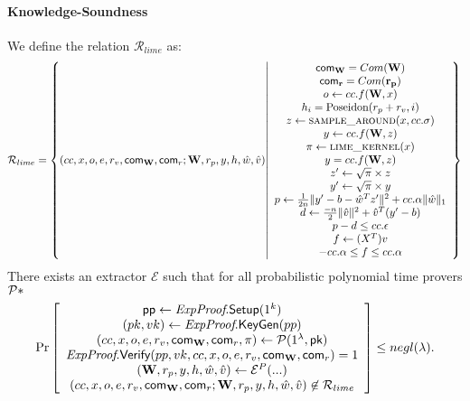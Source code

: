 \paragraph{Knowledge-Soundness}
We define the relation $\mathcal{R}_{lime}$ as:
\[
    \mathcal{R}_{lime} = \left \{ 
            (cc, x, o, e, r_v, \textsf{com}_{\mathbf{W}}, \textsf{com}_r; \mathbf{W}, r_p, y, h, \hat{w}, \hat{v}) \middle \vert 
        \begin{array}{c}
            \textsf{com}_{\mathbf{W}} = Com(\mathbf{W})\\
            \textsf{com}_{\mathbf{r}} = Com(\mathbf{r_p})\\
            o \gets cc.f(\mathbf{W}, x)\\
            h_i = \text{Poseidon}(r_p + r_v, i)\\
            z \gets \textsc{sample\_around}(x, cc.\sigma)\\
            y \gets cc.f(\mathbf{W}, z)\\
            \pi \gets \textsc{lime\_kernel}(x)\\
            y = cc.f(\mathbf{W}, z)\\
            z' \gets \sqrt{\pi} \times z\\
            y' \gets \sqrt{\pi} \times y\\
            p \gets \frac{1}{2n}\lVert y' - b - \hat{w}^Tz' \rVert ^2 + cc.\alpha \lVert \hat{w}\rVert_1\\
            d \gets \frac{-n}{2} \lVert \hat{v} \rVert^2 + \hat{v}^T(y' - b)\\
            p - d \leq cc.\epsilon\\
            f \gets (X^T)v\\
            -cc.\alpha \leq f \leq cc.\alpha
        \end{array}
        \right \}
\]
There exists an extractor $\mathcal{E}$ such that
for all probabilistic polynomial time provers $\cal{P}*$
\[
\operatorname{Pr}
\left[
\begin{array}{c}
\textsf{pp} \gets \textit{ExpProof}.\textsf{Setup}(1^k) \\
(pk, vk) \gets \textit{ExpProof}.\textsf{KeyGen}(pp) \\
(cc, x, o, e, r_v, \textsf{com}_\mathbf{W}, \textsf{com}_r, \pi) \gets \mathcal{P}(1^\lambda, \textsf{pk})\\
\textit{ExpProof}.\textsf{Verify}(pp, vk, cc, x, o, e, r_v, \textsf{com}_\mathbf{W}, \textsf{com}_r) = 1\\
(\mathbf{W}, r_p, y, h, \hat{w}, \hat{v}) \gets \mathcal{E}^{P}(...)\\
(cc, x, o, e, r_v, \textsf{com}_\mathbf{W}, \textsf{com}_r; \mathbf{W}, r_p, y, h, \hat{w}, \hat{v}) \not\in \mathcal{R}_{lime}
\end{array}
\right] \leq negl(\lambda).
\]

